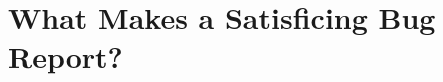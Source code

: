 

%
%

%
%
\newcommand{\keywords}[1]{\par\addvspace\baselineskip
\noindent\keywordname\enspace\ignorespaces#1}



\newlength\Linewidth
\def\findlength{\setlength\Linewidth\linewidth
\addtolength\Linewidth{-4\fboxrule}
\addtolength\Linewidth{-3\fboxsep}
}
\newenvironment{examplebox}{\par\begingroup
   \setlength{\fboxsep}{5pt}\findlength
   \setbox0=\vbox\bgroup\noindent
   \hsize=0.95\linewidth
   \begin{minipage}{0.95\linewidth}\normalsize}
    {\end{minipage}\egroup
    \textcolor{gray20}{\fboxsep1.5pt\fbox
     {\fboxsep5pt\colorbox{gray05}{\normalcolor\box0}}}
    \endgroup\par\noindent
    \normalcolor\ignorespacesafterend}
\let\Examplebox\examplebox
\let\endExamplebox\endexamplebox

%

%

\newcommand{\RQ}[2]{%
\refstepcounter{RQCounter} \label{#1}
 \begin{center}	
  \begin{examplebox}
   \textbf{RQ\arabic{RQCounter}.}~#2
  \end{examplebox}	 
 \end{center}
}



%
%
\chapter{What Makes a Satisficing Bug Report?}\label{ch:model}


